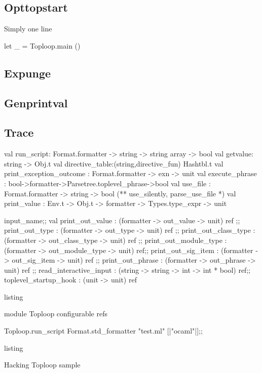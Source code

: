 \subsection{Opttopstart}
Simply one line 
\begin{ocamlcode}
let _ = Toploop.main ()
\end{ocamlcode}


\subsection{Expunge}

\subsection{Genprintval}
\subsection{Trace}





\begin{ocamlcode}
  val run_script: Format.formatter -> string -> string array -> bool
  val getvalue: string -> Obj.t
  val directive_table:(string,directive_fun) Hashtbl.t
  val print_exception_outcome : Format.formatter -> exn -> unit 
  val execute_phrase :
  bool->formatter->Parsetree.toplevel_phrase->bool
  val use_file : Format.formatter -> string -> bool
  (** use_silently, parse_use_file *)
  val print_value : Env.t -> Obj.t -> formatter ->
  Types.type_expr ->  unit
\end{ocamlcode}

\begin{ocamlcode}
  input_name;;
  val print_out_value : (formatter -> out_value -> unit) ref ;;
  print_out_type  : (formatter -> out_type -> unit) ref ;;
  print_out_class_type : (formatter -> out_class_type -> unit) ref ;;
  print_out_module_type : (formatter -> out_module_type -> unit) ref;;
  print_out_sig_item : (formatter -> out_sig_item -> unit) ref ;;
  print_out_phrase : (formatter -> out_phrase -> unit) ref ;;
  read_interactive_input :  (string -> string -> int -> int * bool)  ref;;
  toplevel_startup_hook : (unit -> unit) ref 
\end{ocamlcode}
\caption{listing}{module Toploop configurable refs}

\begin{ocamlcode}
Toploop.run_script Format.std_formatter "test.ml" [|"ocaml"|];;
\end{ocamlcode}
\caption{listing}{Hacking Toploop sample}

